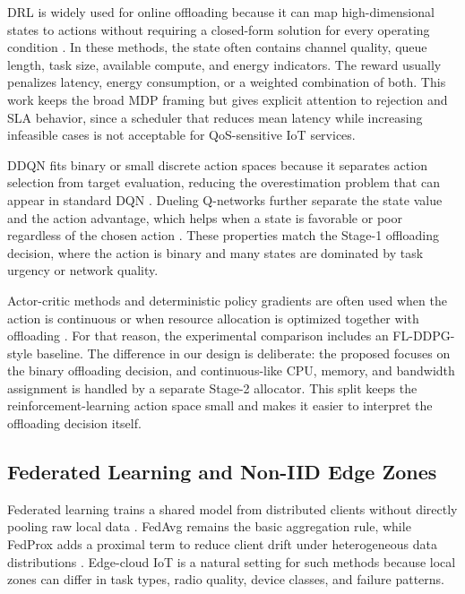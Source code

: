 DRL is widely used for online offloading because it can map high-dimensional states to actions without requiring a closed-form solution for every operating condition \cite{ref03,ref07,ref12}. In these methods, the state often contains channel quality, queue length, task size, available compute, and energy indicators. The reward usually penalizes latency, energy consumption, or a weighted combination of both. This work keeps the broad MDP framing but gives explicit attention to rejection and SLA behavior, since a scheduler that reduces mean latency while increasing infeasible cases is not acceptable for QoS-sensitive IoT services.

DDQN fits binary or small discrete action spaces because it separates action selection from target evaluation, reducing the overestimation problem that can appear in standard DQN \cite{ref35,ref36}. Dueling Q-networks further separate the state value and the action advantage, which helps when a state is favorable or poor regardless of the chosen action \cite{ref41}. These properties match the Stage-1 offloading decision, where the action is binary and many states are dominated by task urgency or network quality.

Actor-critic methods and deterministic policy gradients are often used when the action is continuous or when resource allocation is optimized together with offloading \cite{ref38}. For that reason, the experimental comparison includes an FL-DDPG-style baseline. The difference in our design is deliberate: the proposed \fedddqn{} focuses on the binary offloading decision, and continuous-like CPU, memory, and bandwidth assignment is handled by a separate Stage-2 allocator. This split keeps the reinforcement-learning action space small and makes it easier to interpret the offloading decision itself.

\subsection{Federated Learning and Non-IID Edge Zones}

Federated learning trains a shared model from distributed clients without directly pooling raw local data \cite{ref30,ref32}. FedAvg remains the basic aggregation rule, while FedProx adds a proximal term to reduce client drift under heterogeneous data distributions \cite{ref30,ref31}. Edge-cloud IoT is a natural setting for such methods because local zones can differ in task types, radio quality, device classes, and failure patterns.

